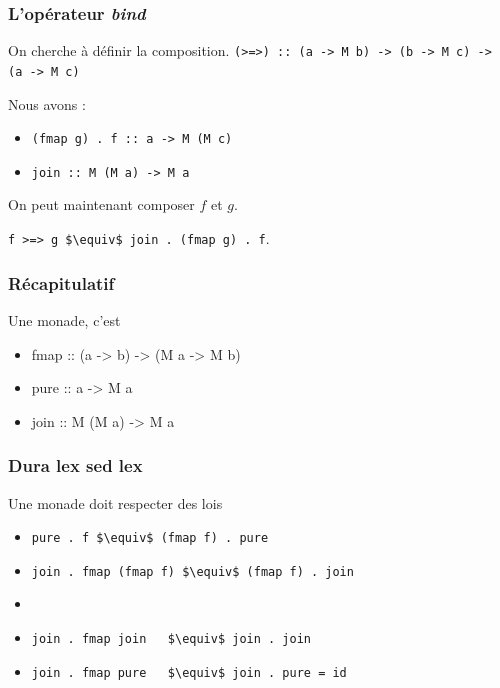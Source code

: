 \documentclass{beamer}
\begin{document}
\begin{frame}
\frametitle{L'opérateur \emph{bind}}
\begin{block}{On cherche à définir la composition.}
\verb!(>=>) :: (a -> M b) -> (b -> M c) -> (a -> M c)!
\end{block}

\pause

\begin{block}{Nous avons :}
\begin{itemize}
\item \verb!(fmap g) . f :: a -> M (M c)!
\item \verb!join :: M (M a) -> M a!
\end{itemize}
\end{block}
\pause

\begin{block}{On peut maintenant composer $f$ et $g$.}

\verb!f >=> g $\equiv$ join . (fmap g) . f!.
\end{block}
\end{frame}

\begin{frame}
\frametitle{Récapitulatif}

\begin{block}{Une monade, c'est}

	\begin{itemize}
		\item fmap :: (a -> b) -> (M a -> M b)
		\item pure :: a -> M a
		\item join :: M (M a) -> M a
	\end{itemize}

\end{block}

\end{frame}

\begin{frame}
\frametitle{Dura lex sed lex}
\begin{alertblock}{Une monade doit respecter des lois}
\begin{itemize}
\item \verb!pure . f $\equiv$ (fmap f) . pure!
\item \verb!join . fmap (fmap f) $\equiv$ (fmap f) . join!
\item[] \ 
\item \verb!join . fmap join   $\equiv$ join . join!
\item \verb!join . fmap pure   $\equiv$ join . pure = id!
\end{itemize}
\end{alertblock}
\end{frame}
\end{document}
